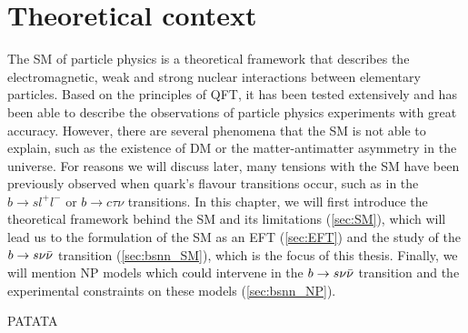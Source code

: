 \chapter{Theoretical context} \label{ch:theory}


The \gls{SM} of particle physics is a theoretical framework that describes the electromagnetic, weak and strong nuclear interactions between elementary particles. 
Based on the principles of \gls{QFT}, it has been tested extensively and has been able to describe the observations of particle physics experiments with great accuracy. 
However, there are several phenomena that the \gls{SM} is not able to explain, such as the existence of \gls{DM} or the matter-antimatter asymmetry in the universe. 
For reasons we will discuss later, many tensions with the \gls{SM} have been previously observed when quark's flavour transitions occur, such as in the $b \to s l^+ l^-$ or $b \to c \tau \nu$ transitions.
In this chapter, we will first introduce the theoretical framework behind the \gls{SM} and its limitations (\ref{sec:SM}), which will lead us to the formulation of the \gls{SM} as an \gls{EFT} (\ref{sec:EFT}) and the study of the $b \to s \nu \Bar{\nu}$ transition (\ref{sec:bsnn_SM}), which is the focus of this thesis.
Finally, we will mention \gls{NP} models which could intervene in the $b \to s \nu \Bar{\nu}$ transition and the experimental constraints on these models (\ref{sec:bsnn_NP}).







PATATA

\cite{kolmogorov}